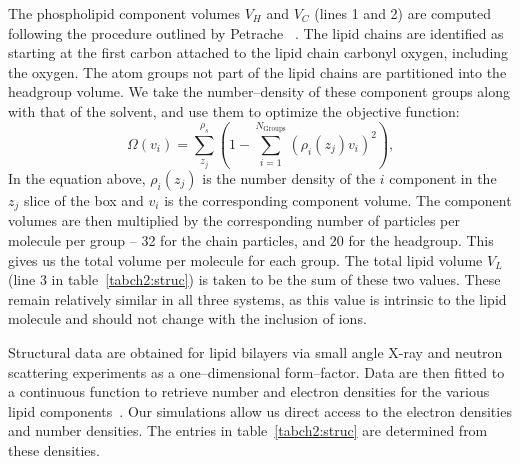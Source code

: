 The phospholipid component volumes $V_H$ and $V_C$ (lines 1 and 2) are
computed following the procedure outlined by Petrache \etal~\cite{petrache:1997}. 
The lipid chains are identified as starting at the first carbon attached to the lipid chain carbonyl oxygen, including the oxygen.
The atom groups not part of the lipid
chains are partitioned into the headgroup volume. 
We take the number--density of these component groups along with that of the solvent, 
and use them to optimize the objective function:
\begin{equation}
    \label{eq:volumeobj}
    \Omega(v_i)=\sum^{\rho_s}_{z_j}(1-\sum^{N_{\text{Groups}}}_{i=1}{(\rho_i(z_j)v_i)^2})\text{,}
\end{equation}
In the equation above, $\rho_i(z_j)$ is the number density of the $i$ component in the
$z_j$ slice of the box and $v_i$ is the corresponding component volume. 
The component volumes are then multiplied by the corresponding
number of particles per molecule per group -- 32 for the chain
particles, and 20 for the headgroup. 
This gives us the total volume per molecule for each group. 
The total lipid volume $V_L$ (line 3 in table~\ref{tabch2:struc}) 
is taken to be the sum of these two values. 
These remain relatively similar in all three systems, 
as this value is intrinsic to the lipid molecule 
and should not change with the inclusion of ions.

Structural data are obtained for lipid bilayers via small angle X-ray and neutron scattering
experiments as a one--dimensional form--factor. Data are then
fitted to a continuous function to retrieve number and electron
densities for the various lipid components~\cite{nagle:2000,fogarty:2015}. 
Our simulations allow us direct access to the electron densities and number densities. 
The entries in table~\ref{tabch2:struc} are determined from these densities.

